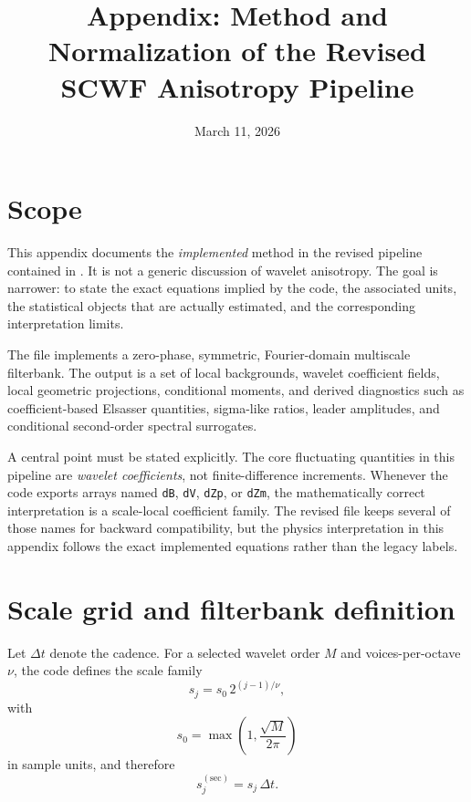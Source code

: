 \documentclass[11pt]{article}
\title{Appendix: Method and Normalization of the Revised SCWF Anisotropy Pipeline}
\author{}
\date{March 11, 2026}
\begin{document}
\maketitle

\section{Scope}

This appendix documents the \emph{implemented} method in the revised pipeline contained in . It is not a generic discussion of wavelet anisotropy. The goal is narrower: to state the exact equations implied by the code, the associated units, the statistical objects that are actually estimated, and the corresponding interpretation limits.

The file implements a zero-phase, symmetric, Fourier-domain multiscale filterbank. The output is a set of local backgrounds, wavelet coefficient fields, local geometric projections, conditional moments, and derived diagnostics such as coefficient-based Elsasser quantities, sigma-like ratios, leader amplitudes, and conditional second-order spectral surrogates.

A central point must be stated explicitly. The core fluctuating quantities in this pipeline are \emph{wavelet coefficients}, not finite-difference increments. Whenever the code exports arrays named \texttt{dB}, \texttt{dV}, \texttt{dZp}, or \texttt{dZm}, the mathematically correct interpretation is a scale-local coefficient family. The revised file keeps several of those names for backward compatibility, but the physics interpretation in this appendix follows the exact implemented equations rather than the legacy labels.

\section{Scale grid and filterbank definition}

Let $\Delta t$ denote the cadence. For a selected wavelet order $M$ and voices-per-octave $\nu$, the code defines the scale family
\begin{equation}
 s_j = s_0 \, 2^{(j-1)/\nu},
\end{equation}
with
\begin{equation}
 s_0 = \max\!\left(1, \frac{\sqrt{M}}{2\pi}\right)
\end{equation}
in sample units, and therefore
\begin{equation}
 s_j^{(\mathrm{sec})} = s_j \, \Delta t.
\end{equation}
\end{document}
